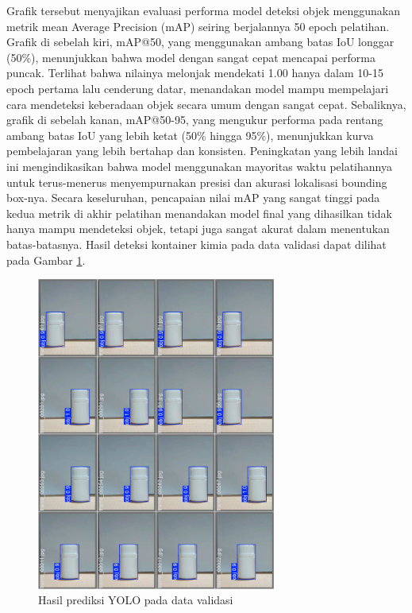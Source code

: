 Grafik tersebut menyajikan evaluasi performa model deteksi objek
menggunakan metrik mean Average Precision (mAP) seiring berjalannya
50 epoch pelatihan. Grafik di sebelah kiri, mAP@50, yang menggunakan
ambang batas IoU longgar (50\%), menunjukkan bahwa model dengan
sangat cepat mencapai performa puncak. Terlihat bahwa nilainya
melonjak mendekati 1.00 hanya dalam 10-15 epoch pertama lalu
cenderung datar, menandakan model mampu mempelajari cara mendeteksi
keberadaan objek secara umum dengan sangat cepat. Sebaliknya, grafik
di sebelah kanan, mAP@50-95, yang mengukur performa pada rentang
ambang batas IoU yang lebih ketat (50\% hingga 95\%), menunjukkan
kurva pembelajaran yang lebih bertahap dan konsisten. Peningkatan
yang lebih landai ini mengindikasikan bahwa model menggunakan
mayoritas waktu pelatihannya untuk terus-menerus menyempurnakan
presisi dan akurasi lokalisasi bounding box-nya. Secara keseluruhan,
pencapaian nilai mAP yang sangat tinggi pada kedua metrik di akhir
pelatihan menandakan model final yang dihasilkan tidak hanya mampu
mendeteksi objek, tetapi juga sangat akurat dalam menentukan
batas-batasnya. Hasil deteksi kontainer kimia pada data validasi
dapat dilihat pada Gambar \ref{fig:yolo-validasi}.

\begin{figure}[H]
  \centering
  \includegraphics[width=0.7\textwidth]{gambar/yolo_validasi.jpg}
  \caption{Hasil prediksi YOLO pada data validasi}
  \label{fig:yolo-validasi}
\end{figure}
\vspace{-1em}

